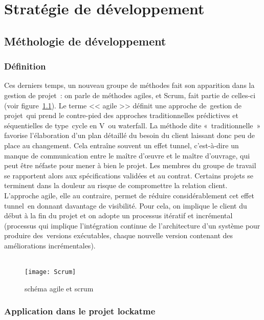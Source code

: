 \chapter{Stratégie de développement}
\newpage

\section{Méthologie de développement}
\subsection{Définition}

Ces derniers temps, un nouveau groupe de méthodes fait son apparition dans la
gestion de projet : on parle de méthodes agiles, et Scrum, fait partie de
celles-ci (voir figure~\ref{fig:scrum}). Le terme << agile >> définit une approche de gestion
de projet qui prend le contre-pied des approches traditionnelles prédictives et
séquentielles de type cycle en V ou waterfall.
La méthode dite « traditionnelle » favorise l’élaboration d’un plan détaillé
du besoin du client laissant donc peu de place au changement. Cela entraîne
souvent un effet tunnel, c’est-à-dire un manque de communication entre le
maître d’œuvre et le maître d’ouvrage, qui peut être néfaste pour mener à bien
le projet. Les membres du groupe de travail se rapportent alors aux
spécifications validées et au contrat. Certains projets se terminent dans la
douleur au risque de compromettre la relation client.
L’approche agile, elle au contraire, permet de réduire considérablement cet
effet tunnel en donnant davantage de visibilité. Pour cela, on implique le
client du début à la fin du projet et on adopte un processus itératif et
incrémental (processus qui implique l'intégration continue de l'architecture
d'un système pour produire des versions exécutables, chaque nouvelle version
contenant des améliorations incrémentales).
\\
\\

\begin{figure}[h]\label{fig:scrum}
  \texttt{[image: Scrum]}
  \caption{schéma agile et scrum}
  \label{fig:scrum}
\end{figure}

\newpage
\subsection{Application dans le projet lockatme}

